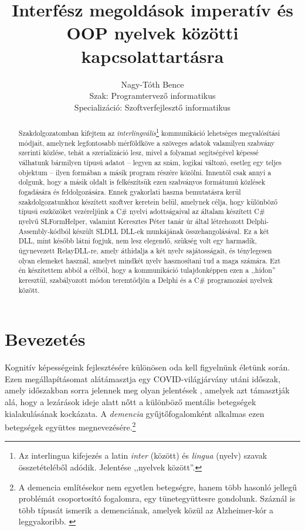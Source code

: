 \documentclass[tocnopagenum]{thesis-ekf}
\theoremstyle{definition}
\theoremstyle{remark}
\begin{document}
	\title{Interfész megoldások imperatív és OOP nyelvek közötti kapcsolattartásra}
	\author{Nagy-Tóth Bence\\Szak: Programtervező informatikus\\Specializáció: Szoftverfejlesztő informatikus}
	\date{\the\year{}}
	\VerbatimFootnotes
	\maketitle
	\tableofcontents
	\begin{abstract}
		Szakdolgozatomban kifejtem az \textit{interlingvális}\footnote{Az interlingua kifejezés a latin \textit{inter} (között) és \textit{lingua} (nyelv) szavak összetételéből adódik. Jelentése ,,nyelvek között''.} kommunikáció lehetséges megvalósítási módjait, amelynek legfontosabb mérföldköve a szöveges adatok valamilyen szabvány szerinti közlése, tehát a szerializáció lesz, mivel a folyamat segítségével képessé válhatunk bármilyen típusú adatot -- legyen az szám, logikai változó, esetleg egy teljes objektum -- ilyen formában a másik program részére közölni. Innentől csak annyi a dolgunk, hogy a másik oldalt is felkészítsük ezen szabványos formátumú közlések fogadására és feldolgozására. Ennek gyakorlati haszna bemutatásra kerül szakdolgozatunkhoz készített szoftver keretein belül, amelynek célja, hogy különböző típusú eszközöket vezéreljünk a C\# nyelvi adottságaival az általam készített C\# nyelvű SLFormHelper, valamint Keresztes Péter tanár úr által létrehozott Delphi-Assembly-kódból készült SLDLL DLL-ek munkájának összehangolásával. Ez a két DLL, mint később látni fogjuk, nem lesz elegendő, szükség volt egy harmadik, úgynevezett RelayDLL-re, amely áthidalja a két nyelv sajátosságait, és ténylegesen olyan elemeket használ, amelyet mindkét nyelv hasznosítani tud a maga számára. Ezt én készítettem abból a célból, hogy a kommunikáció tulajdonképpen ezen a ,,hídon'' keresztül, szabályozott módon teremtődjön a Delphi és a C\# programozási nyelvek között.
	\end{abstract}
	\chapter*{Bevezetés}
	Kognitív képességeink fejlesztésére különösen oda kell figyelnünk életünk során. Ezen megállapításomat alátámasztja egy COVID-világjárvány utáni időszak, amely időszakban sorra jelennek meg olyan jelentések 
	\cite{brain1}, amelyek azt támasztják alá, hogy a lezárások ideje alatt nőtt a különböző mentális betegségek kialakulásának kockázata. A \textit{demencia} gyűjtőfogalomként alkalmas ezen betegségek együttes megnevezésére.\footnote{A demencia említésekor nem egyetlen betegségre, hanem több hasonló jellegű problémát  csoportosító fogalomra, egy tünetegyüttesre gondolunk. Száznál is több típusát ismerik a demenciának, amelyek közül az Alzheimer-kór a leggyakoribb. \cite{demencia_egeszsegvonal}}
	
\end{document}
